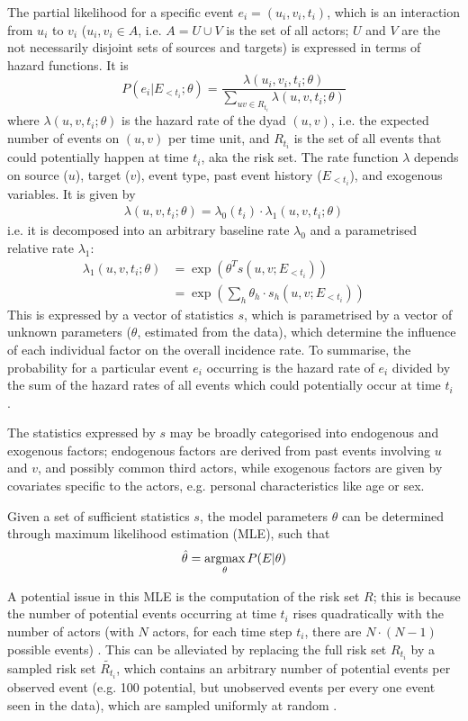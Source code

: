 The partial likelihood for a specific event $e_i = (u_i,v_i,t_i)$, which is an interaction from $u_i$ to $v_i$ ($u_i,v_i \in A$, i.e. $A = U \cup V$ is the set of all actors; $U$ and $V$ are the not necessarily disjoint sets of sources and targets) is expressed in terms of hazard functions. It is
\begin{equation*}
	P(e_i|E_{<t_i};\theta) = \frac{\lambda(u_i,v_i,t_i;\theta)}{\sum_{uv\in R_{t_i}}\lambda(u,v,t_i;\theta)}
\end{equation*}
where $\lambda(u,v,t_i;\theta)$ is the hazard rate of the dyad $(u,v)$, i.e. the expected number of events on $(u,v)$ per time unit, and $R_{t_i}$ is the set of all events that could potentially happen at time $t_i$, aka the risk set. The rate function $\lambda$ depends on source ($u$), target ($v$), event type, past event history ($E_{<t_i}$), and exogenous variables. It is given by
\begin{align*}
	\lambda(u,v,t_i;\theta) = \lambda_0(t_i) \cdot \lambda_1(u,v,t_i;\theta)
\end{align*}
i.e. it is decomposed into an arbitrary baseline rate $\lambda_0$ and a parametrised relative rate $\lambda_1$:
\begin{align*}
	\lambda_1(u,v,t_i;\theta) &= \exp(\theta^T s(u,v;E_{<t_i}))\\
	&= \exp(\sum_h \theta_h \cdot s_h(u,v;E_{<t_i}))&&
\end{align*}
This is expressed by a vector of statistics $s$, which is parametrised by a vector of unknown parameters ($\theta$, estimated from the data), which determine the influence of each individual factor on the overall incidence rate. To summarise, the probability for a particular event $e_i$ occurring is the hazard rate of $e_i$ divided by the sum of the hazard rates of all events which could potentially occur at time $t_i$ \cite{butts20084}.

The statistics expressed by $s$ may be broadly categorised into endogenous and exogenous factors; endogenous factors are derived from past events involving $u$ and $v$, and possibly common third actors, while exogenous factors are given by covariates specific to the actors, e.g. personal characteristics like age or sex. 

Given a set of sufficient statistics $s$, the model parameters $\theta$ can be determined through maximum likelihood estimation (MLE), such that \[\hat{\theta} = \operatorname*{argmax}_{\theta} P(E|\theta)\]

A potential issue in this MLE is the computation of the risk set $R$; this is because the number of potential events occurring at time $t_i$ rises quadratically with the number of actors (with $N$ actors, for each time step $t_i$, there are $N \cdot (N - 1)$ possible events) \cite{butts20084}. This can be alleviated by replacing the full risk set $R_{t_i}$ by a sampled risk set $\tilde{R_{t_i}}$, which contains an arbitrary number of potential events per observed event (e.g. 100 potential, but unobserved events per every one event seen in the data), which are sampled uniformly at random \cite{eventnet_rem}.

